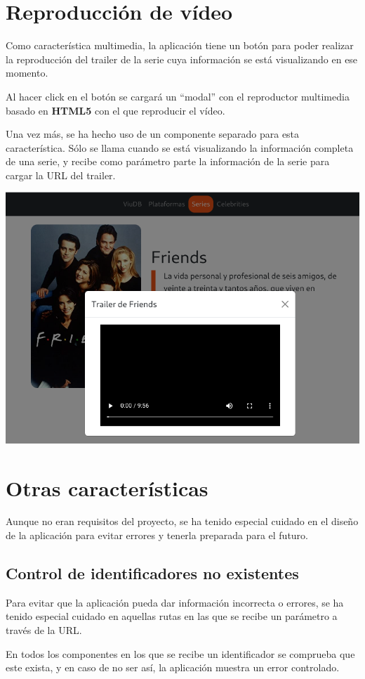 \documentclass{\ClassPath/viu-tfm-template}
\begin{document}
\section{Reproducción de vídeo}

Como característica multimedia, la aplicación tiene un botón para poder realizar la reproducción del trailer de la serie cuya información se está visualizando en ese momento.

Al hacer click en el botón se cargará un “modal” con el reproductor multimedia basado en \textbf{HTML5} con el que reproducir el vídeo.

Una vez más, se ha hecho uso de un componente separado para esta característica. Sólo se llama cuando se está visualizando la información completa de una serie, y recibe como parámetro parte la información de la serie para cargar la URL del trailer.


\begin{center}
    \includegraphics[frame,width=0.7\linewidth]{img/video.png}
\end{center}

\section{Otras características}
Aunque no eran requisitos del proyecto, se ha tenido especial cuidado en el diseño de la aplicación para evitar errores y tenerla preparada para el futuro.

\subsection{Control de identificadores no existentes}
Para evitar que la aplicación pueda dar información incorrecta o errores, se ha tenido especial cuidado en aquellas rutas en las que se recibe un parámetro a través de la URL.

En todos los componentes en los que se recibe un identificador se comprueba que este exista, y en caso de no ser así, la aplicación muestra un error controlado.
\end{document}
